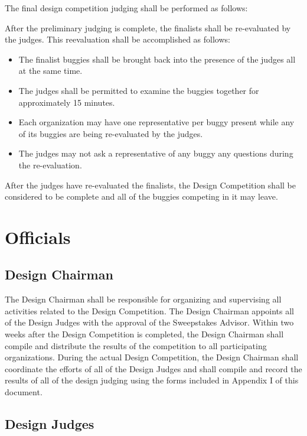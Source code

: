 	The final design competition judging shall be performed as follows:
	\newline

	After the preliminary judging is complete, the finalists shall be re-evaluated by the judges. This reevaluation shall be accomplished as follows:

	\begin{itemize}
		\item The finalist buggies shall be brought back into the presence of the judges all at the same time.
		\item The judges shall be permitted to examine the buggies together for approximately 15 minutes.
		\item Each organization may have one representative per buggy present while any of its buggies are being
		re-evaluated by the judges.		
		\item The judges may not ask a representative of any buggy any questions during the re-evaluation.
	\end{itemize}

	After the judges have re-evaluated the finalists, the Design Competition shall be considered to be complete and all of the buggies competing in it may leave.

\section{Officials}

\subsection{Design Chairman}

	The Design Chairman shall be responsible for organizing and supervising all activities related to the Design Competition. The Design Chairman appoints all of the Design Judges with the approval of the Sweepstakes Advisor. Within two weeks after the Design Competition is completed, the Design Chairman shall compile and distribute the results of the competition to all participating organizations. During the actual Design Competition, the Design Chairman shall coordinate the efforts of all of the Design Judges and shall compile and record the results of all of the design judging using the forms included in Appendix I of this document.

\subsection{Design Judges}

